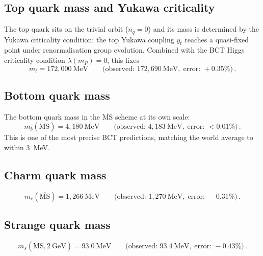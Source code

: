 \documentclass[review,number,sort&compress]{elsarticle}
\begin{document}
\subsection{Top quark mass and Yukawa criticality}

The top quark sits on the trivial orbit ($n_q = 0$) and its mass is
determined by the Yukawa criticality condition: the top Yukawa coupling
$y_t$ reaches a quasi-fixed point under renormalisation group evolution.
Combined with the BCT Higgs criticality condition $\lambda(m_P) = 0$,
this fixes
\begin{equation}
  m_t = 172{,}000~\text{MeV} \qquad
  \bigl(\text{observed: } 172{,}690~\text{MeV},\;
  \text{error: } +0.35\%\bigr)\,.
  \label{eq:mt}
\end{equation}

\subsection{Bottom quark mass}

The bottom quark mass in the $\overline{\mathrm{MS}}$ scheme at its
own scale:
\begin{equation}
  m_b(\overline{\mathrm{MS}}) = 4{,}180~\text{MeV} \qquad
  \bigl(\text{observed: } 4{,}183~\text{MeV},\;
  \text{error: } < 0.01\%\bigr)\,.
  \label{eq:mb}
\end{equation}
This is one of the most precise BCT predictions, matching the
world average to within 3~MeV.

\subsection{Charm quark mass}

\begin{equation}
  m_c(\overline{\mathrm{MS}}) = 1{,}266~\text{MeV} \qquad
  \bigl(\text{observed: } 1{,}270~\text{MeV},\;
  \text{error: } -0.31\%\bigr)\,.
  \label{eq:mc}
\end{equation}

\subsection{Strange quark mass}

\begin{equation}
  m_s(\overline{\mathrm{MS}}, 2~\text{GeV}) = 93.0~\text{MeV} \qquad
  \bigl(\text{observed: } 93.4~\text{MeV},\;
  \text{error: } -0.43\%\bigr)\,.
  \label{eq:ms}
\end{equation}
\end{document}
